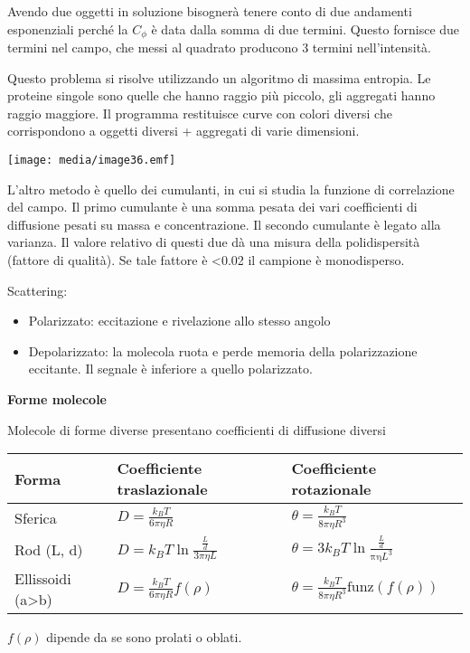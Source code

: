 Avendo due oggetti in soluzione bisognerà tenere conto di due andamenti
esponenziali perché la \(C_{\phi}\) è data dalla somma di due termini.
Questo fornisce due termini nel campo, che messi al quadrato producono 3
termini nell'intensità.

Questo problema si risolve utilizzando un algoritmo di massima entropia.
Le proteine singole sono quelle che hanno raggio più piccolo, gli
aggregati hanno raggio maggiore. Il programma restituisce curve con
colori diversi che corrispondono a oggetti diversi + aggregati di varie
dimensioni.

\texttt{[image: media/image36.emf]}

L'altro metodo è quello dei cumulanti, in cui si studia la funzione di
correlazione del campo. Il primo cumulante è una somma pesata dei vari
coefficienti di diffusione pesati su massa e concentrazione. Il secondo
cumulante è legato alla varianza. Il valore relativo di questi due dà
una misura della polidispersità (fattore di qualità). Se tale fattore è
\textless{}0.02 il campione è monodisperso.

Scattering:

\begin{itemize}
\item
  Polarizzato: eccitazione e rivelazione allo stesso angolo
\item
  Depolarizzato: la molecola ruota e perde memoria della polarizzazione
  eccitante. Il segnale è inferiore a quello polarizzato.
\end{itemize}

\textbf{Forme molecole}

Molecole di forme diverse presentano coefficienti di diffusione diversi

\begin{longtable}[c]{@{}lll@{}}
\toprule
Forma & Coefficiente traslazionale & Coefficiente
rotazionale\tabularnewline
\midrule
\endhead
Sferica & \(D = \frac{k_{B}T}{6\pi\eta R}\) &
\(\theta = \frac{k_{B}T}{8\pi\eta R^{3}}\)\tabularnewline
Rod (L, d) & \(D = k_{B}T\ln\frac{\frac{L}{d}}{3\pi\eta L}\) &
\(\theta = 3k_{B}T\ln\frac{\frac{L}{d}}{\text{πη}L^{3}}\)\tabularnewline
Ellissoidi (a\textgreater{}b) &
\(D = \frac{k_{B}T}{6\pi\eta R}f\left( \rho \right)\) &
\(\theta = \frac{k_{B}T}{8\pi\eta R^{3}}\text{funz}\left( f\left( \rho \right) \right)\)\tabularnewline
\bottomrule
\end{longtable}

\(f\left( \rho \right)\) dipende da se sono prolati o oblati.

